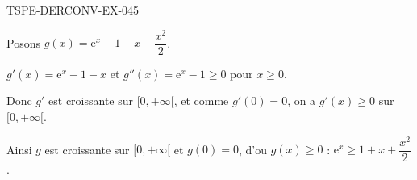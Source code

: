 \begin{corrige}{TSPE-DERCONV-EX-045}

Posons $g(x) = \mathrm{e}^x - 1 - x - \dfrac{x^2}{2}$.

\commentaireMarge{Étudier $g'' = \mathrm{e}^x - 1 \geq 0$ sur $[0,+\infty[$ pour remonter au signe de $g$.}

$g'(x) = \mathrm{e}^x - 1 - x$ et $g''(x) = \mathrm{e}^x - 1 \geq 0$ pour $x \geq 0$.

Donc $g'$ est croissante sur $[0, +\infty[$, et comme $g'(0) = 0$, on a $g'(x) \geq 0$ sur $[0, +\infty[$.

Ainsi $g$ est croissante sur $[0, +\infty[$ et $g(0) = 0$, d'ou $g(x) \geq 0$ : $\mathrm{e}^x \geq 1 + x + \dfrac{x^2}{2}$.

\end{corrige}
